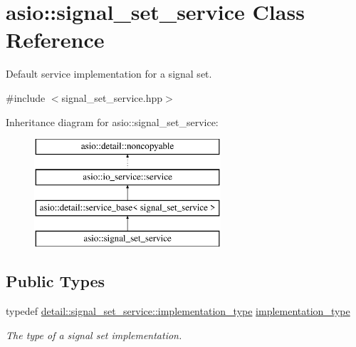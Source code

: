 \hypertarget{classasio_1_1signal__set__service}{}\section{asio\+:\+:signal\+\_\+set\+\_\+service Class Reference}
\label{classasio_1_1signal__set__service}


Default service implementation for a signal set.  




{\ttfamily \#include $<$signal\+\_\+set\+\_\+service.\+hpp$>$}

Inheritance diagram for asio\+:\+:signal\+\_\+set\+\_\+service\+:\begin{figure}[H]
\begin{center}
\leavevmode
\includegraphics[height=4.000000cm]{classasio_1_1signal__set__service}
\end{center}
\end{figure}
\subsection*{Public Types}
\begin{DoxyCompactItemize}
\item 
typedef \hyperlink{classasio_1_1detail_1_1signal__set__service_1_1implementation__type}{detail\+::signal\+\_\+set\+\_\+service\+::implementation\+\_\+type} \hyperlink{classasio_1_1signal__set__service_a15c9b1c4bf96f3491eb2e8e30b5a483a}{implementation\+\_\+type}
\begin{DoxyCompactList}\small\item\em The type of a signal set implementation. \end{DoxyCompactList}\end{DoxyCompactItemize}
